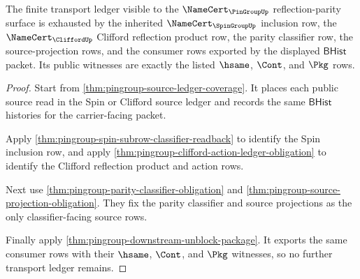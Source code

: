 \begin{theorem}
\label{thm:pingroup-parity-transport-ledger-exhaustion}
The finite transport ledger visible to the $\NameCert_{\PinGroupUp}$
reflection-parity surface is exhausted by the inherited $\NameCert_{\SpinGroupUp}$
inclusion row, the $\NameCert_{\CliffordUp}$ Clifford reflection product row,
the parity classifier row, the source-projection rows, and the consumer rows
exported by the displayed $\mathsf{BHist}$ packet. Its public witnesses are
exactly the listed $\hsame$, $\Cont$, and $\Pkg$ rows.
\end{theorem}
\begin{proof}
Start from \autoref{thm:pingroup-source-ledger-coverage}. It places each public
source read in the Spin or Clifford source ledger and records the same
$\mathsf{BHist}$ histories for the carrier-facing packet.

Apply \autoref{thm:pingroup-spin-subrow-classifier-readback} to identify the
Spin inclusion row, and apply
\autoref{thm:pingroup-clifford-action-ledger-obligation} to identify the
Clifford reflection product and action rows.

Next use \autoref{thm:pingroup-parity-classifier-obligation} and
\autoref{thm:pingroup-source-projection-obligation}. They fix the parity
classifier and source projections as the only classifier-facing source rows.

Finally apply \autoref{thm:pingroup-downstream-unblock-package}. It exports
the same consumer rows with their $\hsame$, $\Cont$, and $\Pkg$ witnesses, so
no further transport ledger remains.
\end{proof}

